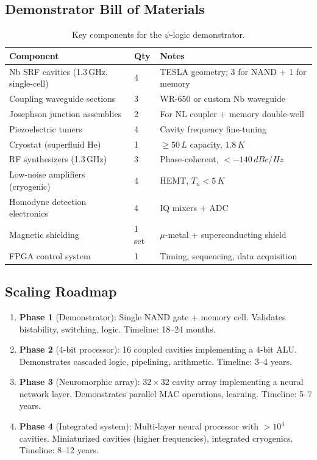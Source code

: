 \documentclass[12pt,a4paper,twoside]{article}
\begin{document}
\subsection{Demonstrator Bill of Materials}\label{sec:bom}

\begin{table}[H]
\centering
\caption{Key components for the $\psi$-logic demonstrator.}
\label{tab:bom}
\begin{tabular}{llp{5cm}}
\toprule
\textbf{Component} & \textbf{Qty} & \textbf{Notes} \\
\midrule
Nb SRF cavities (1.3\,GHz, single-cell) & 4 & TESLA geometry; 3 for NAND + 1 for memory \\
Coupling waveguide sections & 3 & WR-650 or custom Nb waveguide \\
Josephson junction assemblies & 2 & For NL coupler + memory double-well \\
Piezoelectric tuners & 4 & Cavity frequency fine-tuning \\
Cryostat (superfluid He) & 1 & $\geq 50\,\si{L}$ capacity, $1.8\,\si{K}$ \\
RF synthesizers (1.3\,GHz) & 3 & Phase-coherent, $< -140\,\si{dBc/Hz}$ \\
Low-noise amplifiers (cryogenic) & 4 & HEMT, $T_n < 5\,\si{K}$ \\
Homodyne detection electronics & 4 & IQ mixers + ADC \\
Magnetic shielding & 1 set & $\mu$-metal + superconducting shield \\
FPGA control system & 1 & Timing, sequencing, data acquisition \\
\bottomrule
\end{tabular}
\end{table}

\subsection{Scaling Roadmap}\label{sec:scaling}

\begin{enumerate}
\item \textbf{Phase 1} (Demonstrator): Single NAND gate + memory cell. Validates bistability, switching, logic. Timeline: 18--24 months.
\item \textbf{Phase 2} (4-bit processor): 16 coupled cavities implementing a 4-bit ALU. Demonstrates cascaded logic, pipelining, arithmetic. Timeline: 3--4 years.
\item \textbf{Phase 3} (Neuromorphic array): $32 \times 32$ cavity array implementing a neural network layer. Demonstrates parallel MAC operations, learning. Timeline: 5--7 years.
\item \textbf{Phase 4} (Integrated system): Multi-layer neural processor with $> 10^4$ cavities. Miniaturized cavities (higher frequencies), integrated cryogenics. Timeline: 8--12 years.
\end{enumerate}
\end{document}
